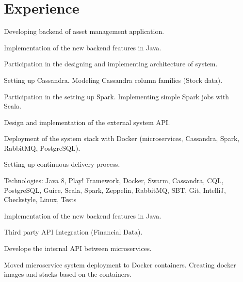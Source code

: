 \documentclass[]{deedy-resume-openfont}
\begin{document}
\begin{minipage}[t]{0.66\textwidth} 


\section{Experience}

Developing backend of asset management application. %
\vspace{\topsep} %
\begin{tightemize}
\item Implementation of the new backend features in Java.
\item Participation in the designing and implementing architecture of system. 
\item Setting up Cassandra. Modeling Cassandra column families (Stock data).
\item Participation in the setting up Spark. Implementing simple Spark jobs with Scala. 
\item Design and implementation of the external system API.
\item Deployment of the system stack with Docker (microservices, Cassandra, Spark, RabbitMQ, PostgreSQL).
\item Setting up continuous delivery process.
\end{tightemize}
Technologies: Java 8, Play! Framework, Docker, Swarm, Cassandra, CQL, PostgreSQL, Guice, Scala, Spark, Zeppelin, RabbitMQ, SBT, Git, IntelliJ, Checkstyle, Linux, Tests
\sectionsep

\begin{tightemize}
\item Implementation of the new backend features in Java.
\item Third party API Integration (Financial Data).
\item Develope the internal API between microservices.
\item Moved microservice system deployment to Docker containers. Creating docker images and stacks based on the containers.
\end{tightemize}
\sectionsep


\end{minipage}
\end{document}
